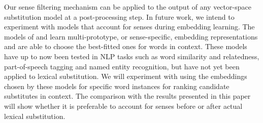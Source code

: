 \documentclass[11pt]{article}
\begin{document}
Our sense filtering mechanism can be applied to the output of any vector-space substitution model at a post-processing step. In future work, we intend to experiment with models that account for senses during embedding learning. The models of  and  learn multi-prototype, or sense-specific, embedding representations and are able to choose the best-fitted ones for words in context. These models have up to now been tested in NLP tasks such as word similarity and relatedness, part-of-speech tagging and named entity recognition, but have not yet been applied to lexical substitution. We will experiment with using the embeddings chosen by these models for specific word instances for ranking candidate substitutes in context. The comparison with the results presented in this paper will show whether it is preferable to account for senses before or after actual lexical substitution.




\end{document}
